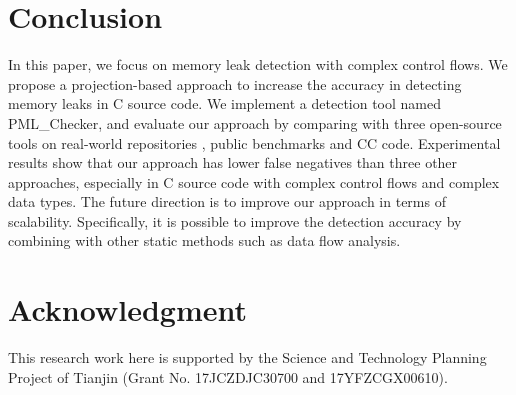 \section{Conclusion}\label{sec:conclusion}

In this paper, we focus on memory leak detection with complex control flows. We propose a projection-based approach to increase the accuracy in detecting memory leaks in C source code. We implement a detection tool named PML\_Checker, and evaluate our approach by comparing with three open-source tools %
on real-world repositories%
, public benchmarks and CC code. Experimental results show that our approach has lower false negatives than three other approaches, especially in C source code with complex control flows and complex data types. The future direction is to improve our approach in terms of scalability. Specifically, it is possible to improve the detection accuracy by combining with other static methods such as data flow analysis.
\section{Acknowledgment}\label{sec:acknowledgment}

This research work here is supported by the Science and Technology Planning Project of Tianjin (Grant No. 17JCZDJC30700 and 17YFZCGX00610).